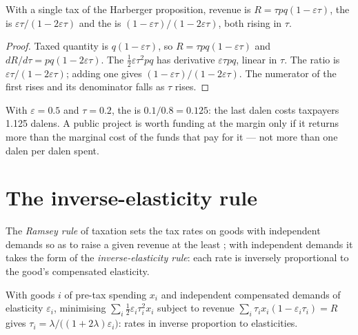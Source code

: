 \begin{proposition}\label{prop:b3:efficiency-cost-of-taxation:meb}
With a single tax of the Harberger proposition, revenue is $R = \tau pq(1 - \varepsilon\tau)$, the  is $\varepsilon\tau/(1 - 2\varepsilon\tau)$ and the  is $(1 - \varepsilon\tau)/(1 - 2\varepsilon\tau)$,
both rising in $\tau$.
\end{proposition}

\begin{proof}
Taxed quantity is $q(1 - \varepsilon\tau)$, so $R = \tau pq(1 - \varepsilon\tau)$ and $dR/d\tau = pq(1 - 2\varepsilon\tau)$. The 
$\tfrac12\varepsilon\tau^2pq$ has derivative $\varepsilon\tau pq$, linear in $\tau$. The ratio is $\varepsilon\tau/(1 - 2\varepsilon\tau)$; adding one gives
$(1 - \varepsilon\tau)/(1 - 2\varepsilon\tau)$. The numerator of the first rises and its denominator falls as $\tau$ rises.
\end{proof}

With $\varepsilon = 0.5$ and $\tau = 0.2$, the  is $0.1/0.8 = 0.125$: the last dalen
costs taxpayers 1.125 dalens. A public project is worth funding at the margin only
if it returns more than the marginal cost of the funds that pay for it --- not more
than one dalen per dalen spent.

\section{The inverse-elasticity rule}\label{sec:b3:efficiency-cost-of-taxation:ramsey}

\begin{definition}\label{def:b3:efficiency-cost-of-taxation:ramsey-rule}
The \emph{Ramsey rule} of taxation sets the tax rates on goods with independent
demands so as to raise a given revenue at the least ; with
independent demands it takes the form of the \emph{inverse-elasticity rule}: each
rate is inversely proportional to the good's compensated elasticity.
\end{definition}

\begin{proposition}\label{prop:b3:efficiency-cost-of-taxation:ramsey}
With goods $i$ of pre-tax spending $x_i$ and independent compensated demands of
elasticity $\varepsilon_i$, minimising $\sum_i \tfrac12\varepsilon_i\tau_i^2x_i$ subject to revenue $\sum_i \tau_ix_i(1 - \varepsilon_i\tau_i) = R$ gives
$\tau_i = \lambda/\big((1 + 2\lambda)\varepsilon_i\big)$: rates in inverse proportion to elasticities.
\end{proposition}

